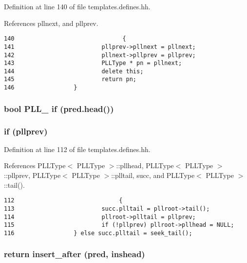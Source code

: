 Definition at line 140 of file templates.defines.hh.

References pllnext, and pllprev.



\footnotesize\begin{verbatim}140                               { 
141                         pllprev->pllnext = pllnext; 
142                         pllnext->pllprev = pllprev; 
143                         PLLType * pn = pllnext; 
144                         delete this; 
145                         return pn; 
146                 } 
\end{verbatim}\normalsize 
{}
\subsubsection{\setlength{\rightskip}{0pt plus 5cm}bool PLL\_\- if ({\bf pred}.head())\hspace{0.3cm}{\tt  [inline]}}\label{templates_8defines_8hh_a16}


\subsubsection{\setlength{\rightskip}{0pt plus 5cm}if ({\bf pllprev})}\label{templates_8defines_8hh_a14}




Definition at line 112 of file templates.defines.hh.

References PLLType$<$ PLLType $>$::pllhead, PLLType$<$ PLLType $>$::pllprev, PLLType$<$ PLLType $>$::plltail, succ, and PLLType$<$ PLLType $>$::tail().



\footnotesize\begin{verbatim}112                              { 
113                         succ.plltail = pllroot->tail(); 
114                         pllroot->plltail = pllprev; 
115                         if (!pllprev) pllroot->pllhead = NULL; 
116                 } else succ.plltail = seek_tail(); 
\end{verbatim}\normalsize 
{}
\subsubsection{\setlength{\rightskip}{0pt plus 5cm}return insert\_\-after ({\bf pred}, inshead)}\label{templates_8defines_8hh_a27}


